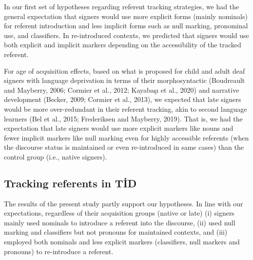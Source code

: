 \documentclass[]{elsarticle} %
\begin{document}
In our first set of hypotheses regarding referent tracking strategies,
we had the general expectation that signers would use more explicit
forms (mainly nominals) for referent introduction and less implicit
forms such as null marking, pronominal use, and classifiers. In
re-introduced contexts, we predicted that signers would use both
explicit and implicit markers depending on the accessibility of the
tracked referent.

For age of acquisition effects, based on what is proposed for child and
adult deaf signers with language deprivation in terms of their
morphosyntactic (Boudreault and Mayberry, 2006; Cormier et al., 2012;
Kayabaşı et al., 2020) and narrative development (Becker, 2009; Cormier
et al., 2013), we expected that late signers would be more
over-redundant in their referent tracking, akin to second language
learners (Bel et al., 2015; Frederiksen and Mayberry, 2019). That is, we
had the expectation that late signers would use more explicit markers
like nouns and fewer implicit markers like null marking even for highly
accessible referents (when the discourse status is maintained or even
re-introduced in same cases) than the control group (i.e., native
signers).

\hypertarget{tracking-referents-in-tid}{%
\subsection{Tracking referents in TİD}\label{tracking-referents-in-tid}}

The results of the present study partly support our hypotheses. In line
with our expectations, regardless of their acquisition groups (native or
late) (i) signers mainly used nominals to introduce a referent into the
discourse, (ii) used null marking and classifiers but not pronouns for
maintained contexts, and (iii) employed both nominals and less explicit
markers (classifiers, null markers and pronouns) to re-introduce a
referent.
\end{document}
